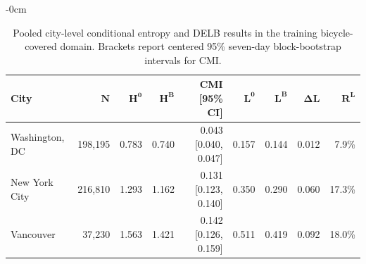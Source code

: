 
\begin{table}[H]
\caption{Pooled city-level conditional entropy and DELB results in the training bicycle-covered domain. Brackets report centered 95\% seven-day block-bootstrap intervals for CMI.}
\label{tab:city_entropy_results}
\begin{adjustwidth}{-\extralength}{0cm}
\centering
\begin{tabular*}{\linewidth}{@{\extracolsep{\fill}}lrrrrrrrr@{}}
\toprule
\textbf{City} & \(\boldsymbol{N}\) & \(\boldsymbol{H^0}\) &
\(\boldsymbol{H^B}\) & \textbf{CMI [95\% CI]} &
\(\boldsymbol{L^0}\) & \(\boldsymbol{L^B}\) &
\(\boldsymbol{\Delta L}\) & \(\boldsymbol{R^L}\)\\
\midrule
Washington, DC & 198,195 & 0.783 & 0.740 & 0.043 [0.040, 0.047] & 0.157 & 0.144 & 0.012 & 7.9\%\\
New York City & 216,810 & 1.293 & 1.162 & 0.131 [0.123, 0.140] & 0.350 & 0.290 & 0.060 & 17.3\%\\
Vancouver & 37,230 & 1.563 & 1.421 & 0.142 [0.126, 0.159] & 0.511 & 0.419 & 0.092 & 18.0\%\\
\bottomrule
\end{tabular*}
\end{adjustwidth}
\end{table}
